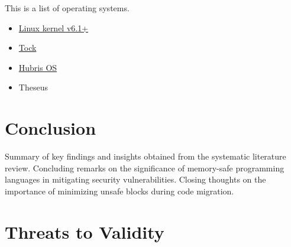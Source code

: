 \documentclass[sigconf]{acmart}
\begin{document}
This is a list of operating systems.
\begin{itemize}
\item \href{https://docs.kernel.org/rust/}{Linux kernel v6.1+}
\item \href{https://github.com/tock/tock}{Tock}
\item \href{https://hubris.oxide.computer/}{Hubris OS}
\item Theseus
\end{itemize}

\section{Conclusion}

Summary of key findings and insights obtained from the systematic literature review.
Concluding remarks on the significance of memory-safe programming languages in mitigating security vulnerabilities.
Closing thoughts on the importance of minimizing unsafe blocks during code migration.

\section{Threats to Validity}
\balance



\end{document}
